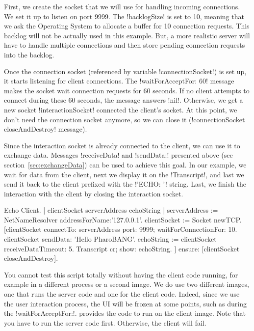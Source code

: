 \documentclass[a4paper,10pt,twoside]{book}
\begin{document}
First, we create the socket that we will use for handling incoming connections.
We set it up to listen on port 9999.
The \ct!backlogSize! is set to 10, meaning that we ask the Operating System to allocate a buffer for 10 connection requests. 
This backlog will not be actually used in this example.
But, a more realistic server will have to handle multiple connections and then store pending connection requests into the backlog.

Once the connection socket (referenced by variable \ct!connectionSocket!) is set up, it starts listening for client connections.
The \ct!waitForAcceptFor: 60! message makes the socket wait connection requests for 60 seconds.
If no client attempts to connect during these 60 seconds, the message answers \ct!nil!.
Otherwise, we get a new socket \ct!interactionSocket! connected the client's socket.
At this point, we don't need the connection socket anymore, so we can close it (\ct!connectionSocket closeAndDestroy! message).

Since the interaction socket is already connected to the client, we can use it to exchange data.
Messages \ct!receiveData! and \ct!sendData:! presented above (see section~\ref{sec:exchangeData}) can be used to achieve this goal.
In our example, we wait for data from the client, next we display it on the \ct!Transcript!, and last we send it back to the client prefixed with the \ct!'ECHO: '! string.
Last, we finish the interaction with the client by closing the interaction socket.

\begin{script}[echoClient]{Echo Client.}
| clientSocket serverAddress echoString |
serverAddress := NetNameResolver addressForName:'127.0.0.1'.
clientSocket := Socket newTCP.
[clientSocket 
	connectTo: serverAddress port: 9999;
	waitForConnectionFor: 10.
 clientSocket sendData: 'Hello PharoBANG'.
 echoString  := clientSocket receiveDataTimeout: 5.
 Transcript cr; show: echoString.
] ensure: [clientSocket closeAndDestroy].
\end{script}


You cannot test this script totally without having the client code running, for example in a different process or a second image. 
We do use two different images, one that runs the server code and one for the client code. 
Indeed, since we use the user interaction process, the \pharo UI will be frozen at some points, such as during the \ct!waitForAcceptFor:!.
 provides the code to run on the client image.
Note that you have to run the server code first.
Otherwise, the client will fail.
\end{document}
